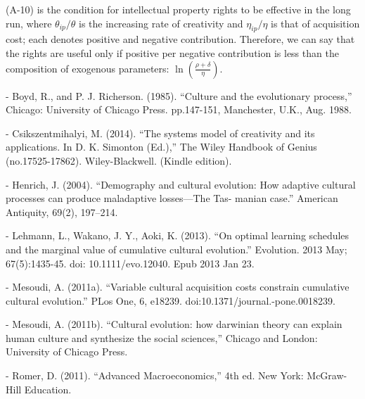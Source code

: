 \documentclass{jsarticle}
\let\footnote=\endnote
\begin{document}
\noindent (A-10) is the condition for intellectual property rights to be effective in the long run, where
$\theta_{ip}/\theta$ is the increasing rate of creativity and $\eta_{ip}/\eta$ is that of acquisition cost; each denotes positive and negative contribution\footnote{If we adhere to using $\sigma$, (A-9) becomes $\frac{\eta_{ip}/\eta}{(\sigma+\sigma_{ip})/\sigma_{ip}} < \ln{\left(\frac{\rho + \delta}{\eta}\right)}$.}.
Therefore, we can say that the rights are useful only if positive per negative contribution is less than the composition of exogenous parameters: $\ln{\left(\frac{\rho + \delta}{\eta}\right)}$.


\begin{thebibliography}{1}
\makeatletter
\def\@biblabel#1{}
\let\old@bibitem\bibitem
\def\bibitem#1{\old@bibitem{#1}\leavevmode\kern-\bibindent}
\makeatother

  \hypertarget{boyd}{ Boyd, R., and P. J. Richerson. (1985).
    ``Culture and the evolutionary process,''  Chicago: University of Chicago Press.
    pp.147-151, Manchester, U.K., Aug. 1988.}
  \hypertarget{csik}{ Csikszentmihalyi, M. (2014).
    ``The systems model of creativity and its applications. In D. K. Simonton (Ed.),'' The Wiley Handbook of Genius (no.17525-17862). Wiley-Blackwell. (Kindle edition).}
  \hypertarget{henrich}{ Henrich, J. (2004).
    ``Demography and cultural evolution: How adaptive cultural processes can produce maladaptive losses—The Tas- manian case.'' American Antiquity, 69(2), 197–214.}
  \hypertarget{lehman}{ Lehmann, L., Wakano, J. Y., Aoki, K. (2013).
    ``On optimal learning schedules and the marginal value of cumulative cultural evolution.'' Evolution. 2013 May; 67(5):1435-45. doi: 10.1111/evo.12040. Epub 2013 Jan 23.}
  \hypertarget{mesoa}{ Mesoudi, A. (2011a).
    ``Variable cultural acquisition costs constrain cumulative cultural evolution.'' PLos One, 6, e18239. doi:10.1371/journal.-pone.0018239.}
  \hypertarget{mesob}{ Mesoudi, A. (2011b).
    ``Cultural evolution: how darwinian theory can explain human culture and synthesize the social sciences,'' Chicago and London: University of Chicago Press.}
  \hypertarget{romer}{ Romer, D. (2011).
    ``Advanced Macroeconomics,'' 4th ed. New York: McGraw-Hill Education.}
\end{thebibliography}

{\small \theendnotes}
\end{document}
